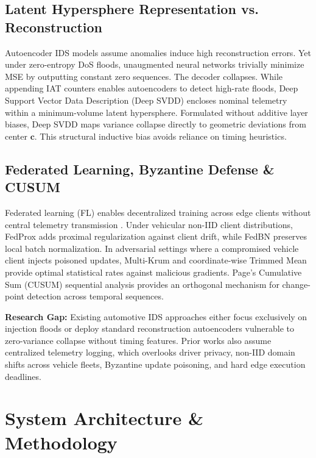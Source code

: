 \documentclass[conference]{IEEEtran}
\begin{document}
\subsection{Latent Hypersphere Representation vs. Reconstruction}
Autoencoder IDS models assume anomalies induce high reconstruction errors. Yet under zero-entropy DoS floods, unaugmented neural networks trivially minimize MSE by outputting constant zero sequences. The decoder collapses. While appending IAT counters enables autoencoders to detect high-rate floods, Deep Support Vector Data Description (Deep SVDD) \cite{ruff2018deepsvdd, wang2021tvt} encloses nominal telemetry within a minimum-volume latent hypersphere. Formulated without additive layer biases, Deep SVDD maps variance collapse directly to geometric deviations from center $\mathbf{c}$. This structural inductive bias avoids reliance on timing heuristics.

\subsection{Federated Learning, Byzantine Defense \& CUSUM}
Federated learning (FL) enables decentralized training across edge clients without central telemetry transmission \cite{mcmahan2017fedavg, fritz2022fl}. Under vehicular non-IID client distributions, FedProx \cite{li2020fedprox} adds proximal regularization against client drift, while FedBN \cite{li2021fedbn} preserves local batch normalization. In adversarial settings where a compromised vehicle client injects poisoned updates, Multi-Krum \cite{blanchard2017byzantine} and coordinate-wise Trimmed Mean \cite{yin2018byzantine} provide optimal statistical rates against malicious gradients. Page's Cumulative Sum (CUSUM) \cite{page1954cusum} sequential analysis provides an orthogonal mechanism for change-point detection across temporal sequences.

\textbf{Research Gap:} Existing automotive IDS approaches either focus exclusively on injection floods or deploy standard reconstruction autoencoders vulnerable to zero-variance collapse without timing features. Prior works also assume centralized telemetry logging, which overlooks driver privacy, non-IID domain shifts across vehicle fleets, Byzantine update poisoning, and hard edge execution deadlines.

\section{System Architecture \& Methodology}
\end{document}
